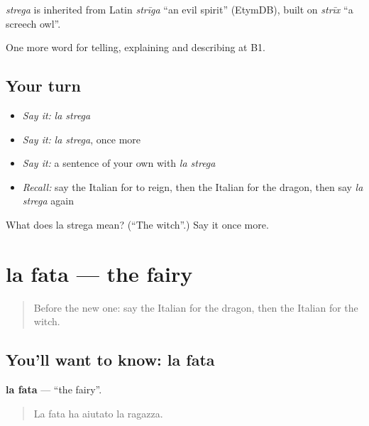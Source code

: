 \begin{cousinweb}
\emph{strega} is inherited from Latin \emph{strīga} \textquotedblleft{}an evil spirit\textquotedblright{} (EtymDB), built on \emph{strīx} \textquotedblleft{}a screech owl\textquotedblright{}.
\end{cousinweb}

\begin{grammarlens}[title={What you've built}]
One more word for telling, explaining and describing at B1.
\end{grammarlens}

\subsection*{Your turn}
\begin{itemize}
\raggedright
  \item \emph{Say it:} \emph{la strega}
  \item \emph{Say it:} \emph{la strega}, once more
  \item \emph{Say it:} a sentence of your own with \emph{la strega}
  \item \emph{Recall:} say the Italian for to reign, then the Italian for the dragon, then say \emph{la strega} again
\end{itemize}

\begin{tcolorbox}[breakable,colback=teal!4,colframe=teal!35!black,title={Before you move on}]
What does la strega mean? (\textquotedblleft{}The witch\textquotedblright{}.) Say it once more.
\end{tcolorbox}
\section[la fata]{la fata — the fairy}

\label{lesson:IT-C326-fata}



\begin{quote}
Before the new one: say the Italian for the dragon, then the Italian for the witch.
\end{quote}

\subsection*{You'll want to know: la fata}
\textbf{la fata} — \textquotedblleft{}the fairy\textquotedblright{}.

\begin{quote}
La fata ha aiutato la ragazza.
\end{quote}

